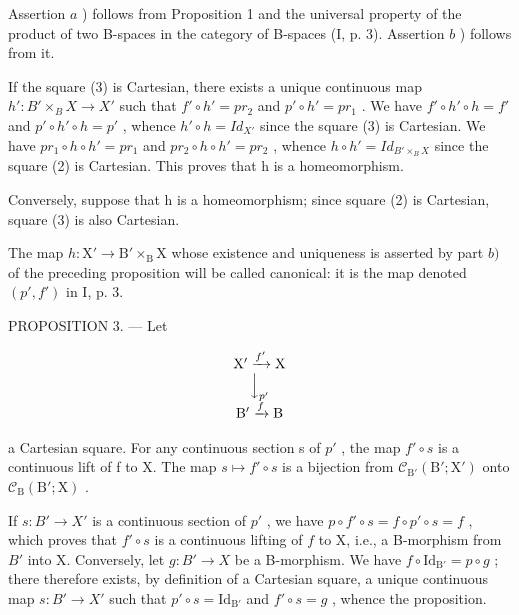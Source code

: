 Assertion \(a\) ) follows from Proposition 1 and the universal property of the product of two B-spaces in the category of B-spaces (I, p. 3). Assertion \(b\) ) follows from it.

If the square (3) is Cartesian, there exists a unique continuous map \(h'\colon B'\times_{B}X\to X'\) such that \(f'\circ h' = pr_{2}\) and \(p'\circ h' = pr_{1}\) . We have \(f'\circ h'\circ h = f'\) and \(p'\circ h'\circ h = p'\) , whence \(h'\circ h = Id_{X'}\) since the square (3) is Cartesian. We have \(pr_{1}\circ h\circ h' = pr_{1}\) and \(pr_{2}\circ h\circ h' = pr_{2}\) , whence \(h\circ h' = Id_{B'\times_{B}X}\) since the square (2) is Cartesian. This proves that h is a homeomorphism.

Conversely, suppose that h is a homeomorphism; since square (2) is Cartesian, square (3) is also Cartesian.

The map \(h \colon \mathrm{X}' \to \mathrm{B}' \times_{\mathrm{B}} \mathrm{X}\) whose existence and uniqueness is asserted by part \(b)\) of the preceding proposition will be called canonical: it is the map denoted \((p', f')\) in I, p. 3.

PROPOSITION 3. --- Let

\[
\begin{array}{c} \mathrm {X^ {\prime}} \xrightarrow {f ^ {\prime}} \mathrm{X} \\ \Big \downarrow_ {p ^ {\prime}} \\ \mathrm {B^ {\prime}} \xrightarrow {f} \mathrm{B} \end{array}
\]

a Cartesian square. For any continuous section s of \(p'\) , the map \(f'\circ s\) is a continuous lift of f to X. The map \(s\mapsto f'\circ s\) is a bijection from \(\mathcal{C}_{\mathrm{B}'}(\mathrm{B}';\mathrm{X}')\) onto \(\mathcal{C}_{\mathrm{B}}(\mathrm{B}';\mathrm{X})\) .

If \(s \colon B' \to X'\) is a continuous section of \(p'\) , we have \(p \circ f' \circ s = f \circ p' \circ s = f\) , which proves that \(f' \circ s\) is a continuous lifting of \(f\) to X, i.e., a B-morphism from \(B'\) into X. Conversely, let \(g \colon B' \to X\) be a B-morphism. We have \(f \circ \mathrm{Id}_{\mathrm{B}'} = p \circ g\) ; there therefore exists, by definition of a Cartesian square, a unique continuous map \(s \colon B' \to X'\) such that \(p' \circ s = \mathrm{Id}_{\mathrm{B}'}\) and \(f' \circ s = g\) , whence the proposition.

